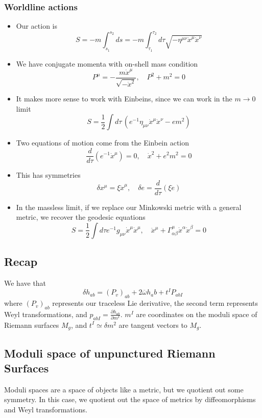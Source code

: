 \documentclass[11pt, oneside]{article}   	%
\theoremstyle{slanted}
\begin{document}
\subsubsection*{Worldline actions}
\begin{itemize}[leftmargin=*]
	\item Our action is 
		\[
			S =  - m \int_{ s_1 } ^{ s_2 } ds 
			 = - m \int_{ \tau_1 } ^{ \tau_2 } d \tau \sqrt{ -
			 \eta ^{ \mu \nu } \dot{ x } ^ \mu \dot{ x } ^ \nu   } 
		\] 
	\item We have conjugate momenta with on-shell mass condition  
		\[
		 P^ \mu = -  \frac{m \dot{ x } ^ \mu  }{\sqrt{  - \dot{ x } ^ 2  }  }, 
		 \quad  P ^ 2 + m ^ 2 = 0 
		\]  
	\item It makes more sense to work with Einbeins,
		since we can work in the $ m \to 0 $ limit 
	\[
		S  = \frac{1}{2 } \int d\tau\, \left( e^{ - 1} 
		\eta _{ \mu \nu } \dot{ x } ^ \mu \dot{ x } ^ \nu   - e m ^ 2   \right)  
	\] 
\item Two equations of motion come from the Einbein action 
	\[
		\frac{d }{ d \tau } \left( e ^{ - 1} \dot{ x } ^ \mu   \right)   = 0 , \quad 
		\dot{ x } ^ 2 + e ^ 2 m ^ 2 = 0  
	\]
\item This has symmetries 
	\[
	 \delta x ^ \mu  = \xi \dot{ x } ^ \mu , \quad \delta e  = \frac{ d }{ d \tau } 
	 \left( \xi \dot{ e }   \right) 
	\]
\item In the massless limit, if we replace our Minkowski metric 
	with a general metric, we recover the geodesic equations 
	\[
	 S  = \frac{1}{2 } \int d \tau  e^{ - 1} g_{ \mu \nu } \dot{ x } ^ \mu \dot{  x } ^ \mu , 
	 \quad \ddot{x } ^ \mu + \Gamma ^ \mu _{ \alpha \beta }  \dot{ x } ^ \alpha 
	 \dot{ x } ^ \beta  = 0 
	\]  
\end{itemize}


\subsection{Recap}

We have that 
\[
	\delta h_{ ab }  = \left( P _ v  \right)  _{ ab } + 2 \overline{ \omega } h _ ab 
	+ t ^ I P _{ ab I }
\]  where $ \left( P_ v  \right) _{ ab } 	  $
represents our traceless Lie derivative, the second term represents 
Weyl transformations, and $ p _{ ab I }  =\frac{\partial  h _{ ab } }{\partial  m ^ I }  $. 
$ m^ I $ are coordinates on the moduli space 
of Riemann surfaces $ M _ g $, and $ t ^ I \simeq \delta m ^ 2 $ 
are tangent vectors to $ M _ g $. 

\subsection{Moduli space of unpunctured Riemann Surfaces}
Moduli spaces are a space of objects 
like a metric, but we quotient out some symmetry. 
In this case, we quotient out the space of metrics 
by diffeomorphisms and Weyl transformations. 
\end{document}
